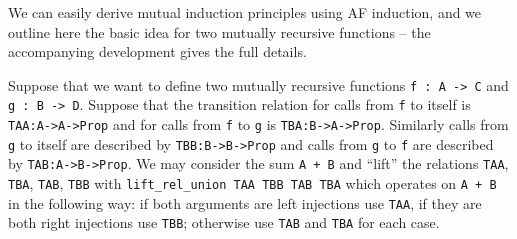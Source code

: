 \documentclass{llncs}
\begin{document}

We can easily derive mutual induction principles using AF induction, and we outline here 
the basic idea for two mutually recursive functions -- the accompanying development gives 
the full details. 

Suppose that we want to define two mutually recursive functions \lstinline|f : A -> C| 
and \lstinline|g : B -> D|. Suppose that the transition relation for calls from \lstinline|f| 
to itself is \lstinline|TAA:A->A->Prop| and for calls from \lstinline|f| to \lstinline|g| is 
\lstinline|TBA:B->A->Prop|. Similarly calls from \lstinline|g| to itself are described
by \lstinline|TBB:B->B->Prop| and calls from \lstinline|g| to \lstinline|f| are 
described by \lstinline|TAB:A->B->Prop|. We may consider the sum \lstinline|A + B|
and ``lift'' the relations \lstinline|TAA|, \lstinline|TBA|, \lstinline|TAB|, \lstinline|TBB| with 
\lstinline|lift_rel_union TAA TBB TAB TBA| which operates on \lstinline|A + B| in the following way: if 
both arguments  are left injections use \lstinline|TAA|, if they are both right 
injections use \lstinline|TBB|; otherwise use \lstinline|TAB| and \lstinline|TBA| for each case.
\end{document}

